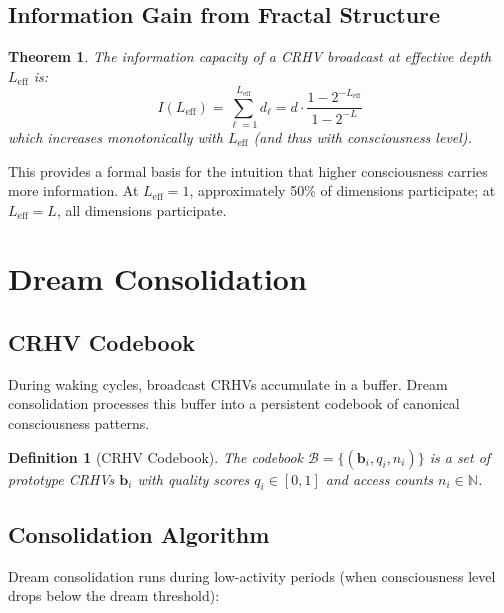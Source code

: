 \documentclass[11pt,a4paper]{article}
\newtheorem{definition}{Definition}
\newtheorem{theorem}{Theorem}
\begin{document}
\subsection{Information Gain from Fractal Structure}

\begin{theorem}
The information capacity of a CRHV broadcast at effective depth $L_{\text{eff}}$ is:
\begin{equation}
I(L_{\text{eff}}) = \sum_{\ell=1}^{L_{\text{eff}}} d_\ell = d \cdot \frac{1 - 2^{-L_{\text{eff}}}}{1 - 2^{-L}}
\end{equation}
which increases monotonically with $L_{\text{eff}}$ (and thus with consciousness level).
\end{theorem}

This provides a formal basis for the intuition that higher consciousness carries more information. At $L_{\text{eff}} = 1$, approximately 50\% of dimensions participate; at $L_{\text{eff}} = L$, all dimensions participate.

\section{Dream Consolidation}

\subsection{CRHV Codebook}

During waking cycles, broadcast CRHVs accumulate in a buffer. Dream consolidation processes this buffer into a persistent codebook of canonical consciousness patterns.

\begin{definition}[CRHV Codebook]
The codebook $\mathcal{B} = \{(\mathbf{b}_i, q_i, n_i)\}$ is a set of prototype CRHVs $\mathbf{b}_i$ with quality scores $q_i \in [0, 1]$ and access counts $n_i \in \mathbb{N}$.
\end{definition}

\subsection{Consolidation Algorithm}

Dream consolidation runs during low-activity periods (when consciousness level drops below the dream threshold):
\end{document}
